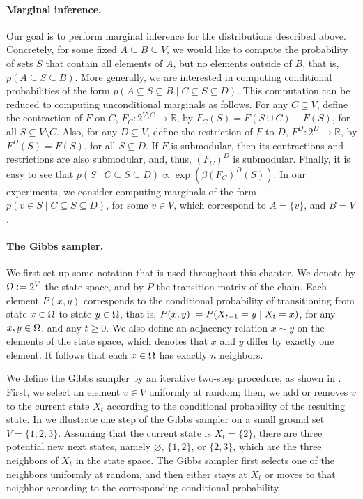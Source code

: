 \paragraph{Marginal inference.}
Our goal is to perform marginal inference for the distributions described above.
Concretely, for some fixed $A \subseteq B \subseteq V$, we would like to compute the probability of sets $S$ that contain all elements of $A$, but no elements outside of $B$, that is, $p(A \subseteq S \subseteq B)$.
More generally, we are interested in computing conditional probabilities of the form $p(A \subseteq S \subseteq B \mid C \subseteq S \subseteq D)$.
This computation can be reduced to computing unconditional marginals as follows.
For any $C \subseteq V$, define the contraction of $F$ on $C$, $F_C : 2^{V \setminus C} \to \mathbb{R}$, by $F_C(S) = F(S \cup C) - F(S)$, for all $S \subseteq V \setminus C$.
Also, for any $D \subseteq V$, define the restriction of $F$ to $D$, $F^D : 2^D \to \mathbb{R}$, by $F^D(S) = F(S)$, for all $S \subseteq D$.
If $F$ is submodular, then its contractions and restrictions are also submodular, and, thus, $(F_C)^D$ is submodular.
Finally, it is easy to see that $p(S \mid C \subseteq S \subseteq D) \propto \exp(\beta (F_C)^D(S))$.
In our experiments, we consider computing marginals of the form $p(v \in S \mid C \subseteq S \subseteq D)$, for some $v \in V$, which correspond to $A = \{v\}$, and $B = V$.

\paragraph{The Gibbs sampler.}
We first set up some notation that is used throughout this chapter.
We denote by $\ss \defeq 2^V$ the state space, and by $P$ the transition matrix of the chain.
Each element $P(x, y)$ corresponds to the conditional probability of transitioning from state $x \in \ss$ to state $y \in \ss$, that is, $P(x, y) \defeq P(X_{t+1} = y \mid X_{t} = x)$, for any $x, y \in \ss$, and any $t \geq 0$.
We also define an adjacency relation $x \sim y$ on the elements of the state space, which denotes that $x$ and $y$ differ by exactly one element.
It follows that each $x \in \ss$ has exactly $n$ neighbors.

We define the Gibbs sampler by an iterative two-step procedure, as shown in .
First, we select an element $v \in V$ uniformly at random; then, we add or removes $v$ to the current state $X_t$ according to the conditional probability of the resulting state.
In  we illustrate one step of the Gibbs sampler on a small ground set $V = \{1, 2, 3\}$.
Assuming that the current state is $X_t = \{2\}$, there are three potential new next states, namely $\varnothing$, $\{1, 2\}$, or $\{2, 3\}$, which are the three neighbors of $X_t$ in the state space.
The Gibbs sampler first selects one of the neighbors uniformly at random, and then either stays at $X_t$ or moves to that neighbor according to the corresponding conditional probability.

